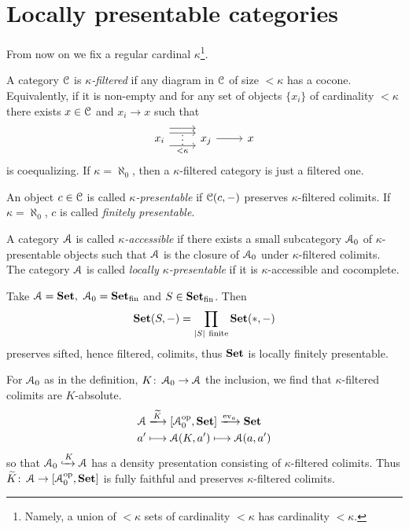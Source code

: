 \documentclass[a4paper,11pt,oneside,openany]{scrbook}
\begin{document}
\section{Locally presentable categories}
From now on we fix a regular cardinal $\kappa$\footnote{Namely, a union of
$<\kappa$ sets of cardinality $<\kappa$ has cardinality $<\kappa$.}.
\begin{defn}
	A category $\operatorname{\mathcal{C}}$ is \emph{$\kappa$-filtered} if any diagram in $\operatorname{\mathcal{C}}$ of size
    $<\kappa$ has a cocone. Equivalently, if it is non-empty and for any set of
    objects $\{x_i\}$ of cardinality $<\kappa$ there exists $x\in\operatorname{\mathcal{C}}$ and $x_i\to
    x$ such that
	\[
		\begin{tikzcd}
			x_i\arrow[r,shift left=2.2ex] \arrow[r,shift left=1.2ex,""{name=A}] \arrow[r, shift right=1.5ex,"<\kappa"',""{name=B}]\ar[from=A, to=B, phantom, "\vdots"]&x_j \arrow[r]&x
		\end{tikzcd}
	\]
	is coequalizing. If $\kappa=\aleph_0$, then a $\kappa$-filtered category is just a
    filtered one.
\end{defn}
\begin{defn}
	An object $c\in\operatorname{\mathcal{C}}$ is called \emph{$\kappa$-presentable} if $\operatorname{\mathcal{C}}(c,-)$
    preserves $\kappa$-filtered colimits. If $\kappa=\aleph_0$, $c$ is called
    \emph{finitely presentable}.
\end{defn}
\begin{defn}
	A category $\operatorname{\mathcal{A}}$ is called \emph{$\kappa$-accessible} if there exists a small
    subcategory $\operatorname{\mathcal{A}}_0$ of $\kappa$-presentable objects such that $\operatorname{\mathcal{A}}$ is the
    closure of $\operatorname{\mathcal{A}}_0$ under $\kappa$-filtered colimits. The category $\operatorname{\mathcal{A}}$ is
    called \emph{locally $\kappa$-presentable} if it is $\kappa$-accessible and
    cocomplete.
\end{defn}
\begin{exmp}
	Take $\A=\Set,\ \A_0=\Set_\text{fin}$ and $S\in{\normalfont\textbf{Set}}_\text{fin}$. Then $$\Set(S,-)=\displaystyle\prod_{|S| \ \text{finite}}\Set(*,-)$$
	preserves sifted, hence filtered, colimits, thus ${\normalfont\textbf{Set}}$ is locally finitely
    presentable.
\end{exmp}
\begin{rmk}
	For $\operatorname{\mathcal{A}}_0$ as in the definition, $K\colon\operatorname{\mathcal{A}}_0\to\operatorname{\mathcal{A}}$ the inclusion, we find
    that $\kappa$-filtered colimits are $K$-absolute.
	\begin{align*}
		\A & \xlongrightarrow{\widetilde{K}}\left[\A_0^{\op},\Set\right]\xlongrightarrow{\text{ev}_a}\Set \\
		a' & \longmapsto\A(K,a')\longmapsto\A(a,a')
	\end{align*}
	so that $\operatorname{\mathcal{A}}_0\xhookrightarrow{K}\operatorname{\mathcal{A}}$ has a density presentation consisting of
    $\kappa$-filtered colimits. Thus
    $\widetilde{K}\colon\operatorname{\mathcal{A}}\to\left[\operatorname{\mathcal{A}}_0^{\operatorname{\text{op}}},{\normalfont\textbf{Set}}\right]$ is fully faithful and
    preserves $\kappa$-filtered colimits.
\end{rmk}
\end{document}
